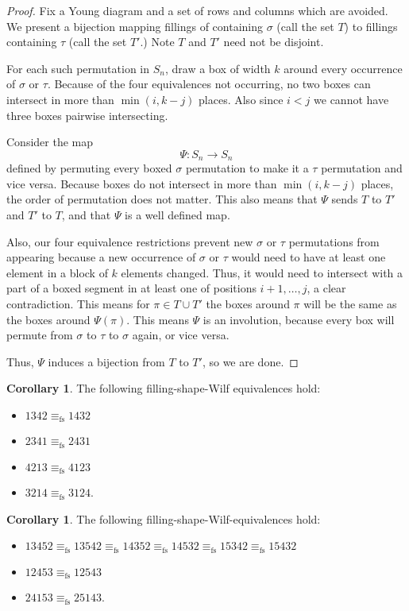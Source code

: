 \documentclass[11pt]{amsart}
\theoremstyle{definition}
\newtheorem{corollary}[theorem]{Corollary}
\begin{document}
\begin{proof}
    Fix a Young diagram and a set of rows and columns which are avoided.  We present a bijection mapping fillings of containing $\sigma$ (call the set $T$) to fillings containing $\tau$ (call the set $T'$.)  Note $T$ and $T'$ need not be disjoint.
	
	For each such permutation in $S_n$, draw a box of width $k$ around every occurrence of $\sigma$ or $\tau$.  Because of the four equivalences not occurring, no two boxes can intersect in more than $\min(i, k-j)$ places.  Also since $i < j$ we cannot have three boxes pairwise intersecting.
    
	Consider the map \[ \Psi : S_n \to S_n \]
	defined by permuting every boxed $\sigma$ permutation to make it a $\tau$ permutation and vice versa.  Because boxes do not intersect in more than $\min(i, k-j)$ places, the order of permutation does not matter.  This also means that $\Psi$ sends $T$ to $T'$ and $T'$ to $T$, and that $\Psi$ is a well defined map.
    
    Also, our four equivalence restrictions prevent new $\sigma$ or $\tau$ permutations from appearing because a new occurrence of $\sigma$ or $\tau$ would need to have at least one element in a block of $k$ elements changed.  Thus, it would need to intersect with a part of a boxed segment in at least one of positions $i+1, \ldots, j$, a clear contradiction.  This means for $\pi \in T \cup T'$ the boxes around $\pi$ will be the same as the boxes around $\Psi(\pi)$.  This means $\Psi$ is an involution, because every box will permute from $\sigma$ to $\tau$ to $\sigma$ again, or vice versa.
	
	Thus, $\Psi$ induces a bijection from $T$ to $T'$, so we are done.
\end{proof}

\begin{corollary}
    \label{BaxterShapeConjecture}
    The following filling-shape-Wilf equivalences hold:
    \begin{itemize}
		\item $1342 {\equiv_{\textrm{fs}}} 1432$
		\item $2341 {\equiv_{\textrm{fs}}} 2431$
		\item $4213 {\equiv_{\textrm{fs}}} 4123$
		\item $3214 {\equiv_{\textrm{fs}}} 3124$.
	\end{itemize}
\end{corollary}

\begin{corollary}
	\label{cor:known5}
    The following filling-shape-Wilf-equivalences hold:
	\begin{itemize}
		\item $13452 {\equiv_{\textrm{fs}}} 13542 {\equiv_{\textrm{fs}}} 14352 {\equiv_{\textrm{fs}}} 14532 {\equiv_{\textrm{fs}}} 15342 {\equiv_{\textrm{fs}}} 15432$
		\item $12453 {\equiv_{\textrm{fs}}} 12543$
		\item $24153 {\equiv_{\textrm{fs}}} 25143$.
	\end{itemize}
\end{corollary}
\end{document}
